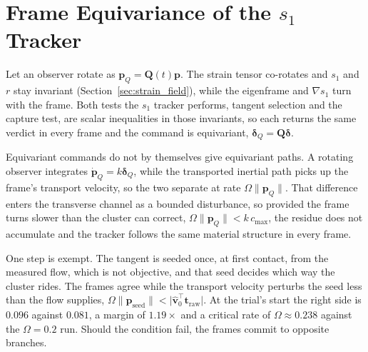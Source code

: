 \documentclass[lettersize,journal]{IEEEtran}
\begin{document}
\appendices

\section{Frame Equivariance of the $s_1$ Tracker}
\label{app:equivariance}

Let an observer rotate as $\mathbf{p}_Q = \mathbf{Q}(t)\mathbf{p}$. The
strain tensor co-rotates and $s_1$ and $r$ stay invariant
(Section~\ref{sec:strain_field}), while the eigenframe and $\nabla s_1$
turn with the frame. Both tests the $s_1$ tracker performs, tangent
selection and the capture test, are scalar inequalities in those
invariants, so each returns the same verdict in every frame and the
command is equivariant, $\boldsymbol{\delta}_Q =
\mathbf{Q}\boldsymbol{\delta}$.

Equivariant commands do not by themselves give equivariant paths. A
rotating observer integrates $\dot{\mathbf{p}}_Q = k\boldsymbol{\delta}_Q$,
while the transported inertial path picks up the frame's transport
velocity, so the two separate at rate $\Omega\lVert\mathbf{p}_Q\rVert$.
That difference enters the transverse channel as a bounded disturbance,
so provided the frame turns slower than the cluster can correct,
$\Omega\lVert\mathbf{p}_Q\rVert < k\,c_{\max}$, the residue does not
accumulate and the tracker follows the same material structure in every
frame.

One step is exempt. The tangent is seeded once, at first contact, from
the measured flow, which is not objective, and that seed decides which
way the cluster rides. The frames agree while the transport
velocity perturbs the seed less than the flow supplies,
$\Omega\lVert\mathbf{p}_{\text{seed}}\rVert <
\lvert\hat{\mathbf{v}}_0^\top\mathbf{t}_{\text{raw}}\rvert$.
At the trial's start the right side is $0.096$ against
$0.081$, a margin of $1.19\times$ and a critical rate of
$\Omega \approx 0.238$ against the $\Omega = 0.2$ run. Should the
condition fail, the frames commit to opposite branches.
\end{document}

